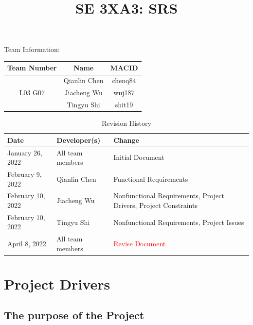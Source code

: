 \documentclass[12pt]{article}
\title{SE 3XA3: SRS}
\begin{document}
\maketitle

{\Large Team Information:}
\begin{table}[htp]
\centering
{\Large
\begin{tabular}{|c|c|c|}
\hline
\multicolumn{1}{|l|}{Team Number} & Name         & MACID   \\ \hline
\multirow{3}{*}{L03 G07}          & Qianlin Chen & chenq84 \\ \cline{2-3} 
                                  & Jiacheng Wu  & wuj187  \\ \cline{2-3} 
                                  & Tingyu Shi   & shit19  \\ \hline
\end{tabular}
}
\end{table}

\newpage
\begin{table}[htp]
\caption{Revision History} 
\begin{tabularx}{\textwidth}{llX}
\toprule
\textbf{Date} & \textbf{Developer(s)} & \textbf{Change}\\
\midrule
January 26, 2022 & All team members & Initial Document\\
February 9, 2022 & Qianlin Chen & Functional Requirements\\
February 10, 2022 & Jiacheng Wu & Nonfunctional Requirements, Project Drivers, Project Constraints\\
February 10, 2022 & Tingyu Shi & Nonfunctional Requirements, Project Issues\\
April 8, 2022 & All team members & \textcolor{red}{Revise Document}\\
\bottomrule
\end{tabularx}
\end{table}
\newpage
\tableofcontents
\listoftables
\listoffigures
\cleardoublepage
\section{Project Drivers}
\subsection{The purpose of the Project}
\end{document}
